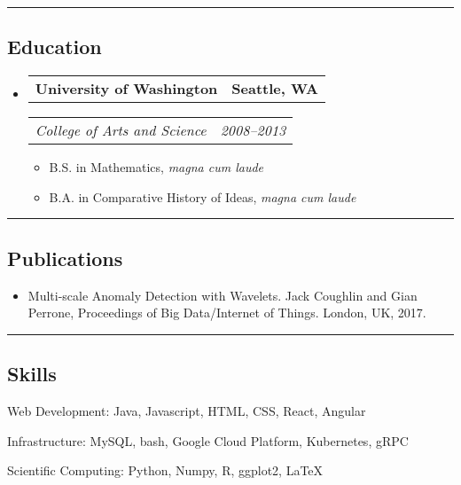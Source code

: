 \documentclass[letterpaper,10pt]{article}
\makeatletter
\newenvironment{indentsection}[1]%
{\begin{list}{}%
	{\setlength{\leftmargin}{#1}}%
	\item[]%
}
{\end{list}}
\newcommand{\headerrow}[2]
{\begin{tabular*}{\linewidth}{l@{\extracolsep{\fill}}r}
	#1 &
	#2 \\
\end{tabular*}}
\makeatother
\begin{document}
\hrule
\vspace{-0.4em}
\subsection*{Education}
\begin{itemize}
  \item
    \headerrow
      {\textbf{University of Washington}}
      {\textbf{Seattle, WA}}
    \headerrow
      {\emph{College of Arts and Science}}
      {\emph{2008--2013}}
    \begin{itemize}
      \item B.S. in Mathematics, \emph{magna cum laude}
      \item B.A. in Comparative History of Ideas, \emph{magna cum laude}
  \end{itemize}
\end{itemize}

\hrule
\vspace{-0.4em}
\subsection*{Publications}
\begin{itemize}
  \item
    Multi-scale Anomaly Detection with Wavelets. Jack Coughlin and Gian Perrone, Proceedings of Big Data/Internet of Things. London, UK, 2017.
\end{itemize}

\hrule
\vspace{-0.4em}
\subsection*{Skills}
\begin{indentsection}{\parindent}
  \begin{description*}
    \item[Web Development:] Java, Javascript, HTML, CSS, React, Angular
    \item[Infrastructure:] MySQL, bash, Google Cloud Platform, Kubernetes, gRPC
    \item[Scientific Computing:] Python, Numpy, R, ggplot2, \LaTeX
  \end{description*}
\end{indentsection}
\end{document}
